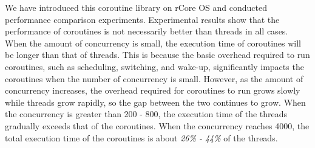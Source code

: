 \documentclass[10pt]{article}
\begin{document}
We have introduced this coroutine library on rCore OS and conducted performance comparison experiments. Experimental results show that the performance of coroutines is not necessarily better than threads in all cases. When the amount of concurrency is small, the execution time of coroutines will be longer than that of threads. This is because the basic overhead required to run coroutines, such as scheduling, switching, and wake-up, significantly impacts the coroutines when the number of concurrency is small. However, as the amount of concurrency increases, the overhead required for coroutines to run grows slowly while threads grow rapidly, so the gap between the two continues to grow. When the concurrency is greater than 200 - 800, the execution time of the threads gradually exceeds that of the coroutines. When the concurrency reaches 4000, the total execution time of the coroutines is about \textit{26\% - 44\%} of the threads.


\makeatletter
\def\url@leostyle{%
  \@ifundefined{selectfont}{\def\UrlFont{\sf}}{\def\UrlFont{\small\ttfamily}}}
\makeatother



\end{document}
